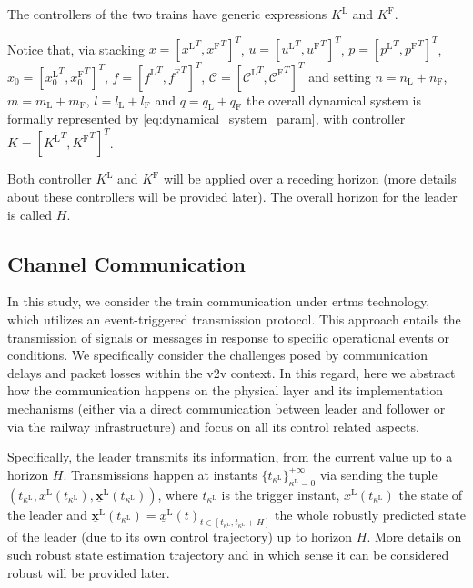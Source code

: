 \documentclass[letterpaper, 10 pt, conference]{ieeeconf}
\theoremstyle{definition}
\theoremstyle{nopoint}
\begin{document}
The controllers of the two trains have generic expressions $K^\mathrm{L}$ and $K^\mathrm{F}$.


Notice that, via stacking $x=[{x^\mathrm{L}}^T, {x^\mathrm{F}}^T]^T$, $u=[{u^\mathrm{L}}^T, {u^\mathrm{F}}^T]^T$, $p=[{p^\mathrm{L}}^T, {p^\mathrm{F}}^T]^T$, $x_0=[{x_0^\mathrm{L}}^T, {x_0^\mathrm{F}}^T]^T$, $f=[{f^\mathrm{L}}^T, {f^\mathrm{F}}^T]^T$, $\mathcal{C}=[{\mathcal{C^\mathrm{L}}}^T, {\mathcal{C^\mathrm{F}}}^T]^T$ and setting $n=n_\mathrm{L}+n_\mathrm{F}$, $m=m_\mathrm{L}+m_\mathrm{F}$, $l=l_\mathrm{L}+l_\mathrm{F}$ and $q=q_\mathrm{L}+q_\mathrm{F}$ the overall dynamical system is formally represented by \eqref{eq:dynamical_system_param}, with controller $K=[{K^\mathrm{L}}^T, {K^\mathrm{F}}^T]^T$. 

Both controller $K^\mathrm{L}$ and $K^\mathrm{F}$ will be applied over a receding horizon (more details about these controllers will be provided later). The overall horizon for the leader is called $H$.



%
\subsection{Channel Communication}
\label{subsec:transmissionEvent}


In this study, we consider the train communication under \gls{ertms} technology, which  utilizes an event-triggered transmission protocol. This approach entails the transmission of signals or messages in response to specific operational events or conditions. We specifically consider the challenges posed by communication delays and packet losses within the \gls{v2v} context.
In this regard, here we abstract how the communication happens on the physical layer and its implementation mechanisms (either via a direct communication between leader and follower or via the railway infrastructure) and focus on all its control related aspects.


Specifically, the leader transmits its information, from the current value up to a horizon \(H\). Transmissions happen at instants \(\{ t_{\kappa^\mathrm{L}} \}_{\kappa^\mathrm{L}=0}^{+\infty}\) via sending the tuple $\left ( t_{\kappa^\mathrm{L}}, x^\mathrm{L}(t_{\kappa^\mathrm{L}}),\underline{\mathbf{x}}^\mathrm{L}(t_{\kappa^\mathrm{L}})\right)$, where $t_{\kappa^\mathrm{L}}$ is the trigger instant, $x^\mathrm{L}(t_{\kappa^\mathrm{L}})$ the state of the leader and 
$\underline{\mathbf{x}}^\mathrm{L}(t_{\kappa^\mathrm{L}})=\underline{x}^\mathrm{L}(t)_{t\in [t_{\kappa^\mathrm{L}}, t_{\kappa^\mathrm{L}} + H]}$ the whole robustly predicted state of the leader (due to its own control trajectory) up to horizon $H$.
More details on  such robust state estimation trajectory and in which sense it can be considered robust will be provided later. 
\end{document}

